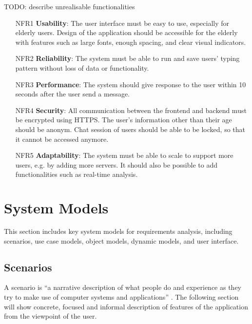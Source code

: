 TODO: describe unrealisable functionalities

\begin{itemize} 
    \item [NFR1] \textbf{Usability}: The user interface must be easy to use, especially for elderly users.
    Design of the application should be accessible for the elderly with features such as large fonts, enough spacing, and clear visual indicators. 
    \item [NFR2] \textbf{Reliability}: The system must be able to run and save users' typing pattern without loss of data or functionality. 
    \item [NFR3] \textbf{Performance}: The system should give response to the user within 10 seconds after the user send a message. 
    \item [NFR4] \textbf{Security}: All communication between the frontend and backend must be encrypted using HTTPS.
    The user's information other than their age should be anonym.
    Chat session of users should be able to be locked, so that it cannot be accessed anymore.
    \item [NFR5] \textbf{Adaptability}: The system must be able to scale to support more users, e.g. by adding more servers.
    It should also be possible to add functionalities such as real-time analysis. 
\end{itemize}

\section{System Models}


This section includes key system models for requirements analysis, including scenarios, use case models, object models, dynamic models, and user interface.

\subsection{Scenarios}

A scenario is “a narrative description of what people do and experience as they try to make use of computer systems and applications” \cite{Carroll1995}. 
The following section will show concrete, focused and informal description of features of the application from the viewpoint of the user. 


